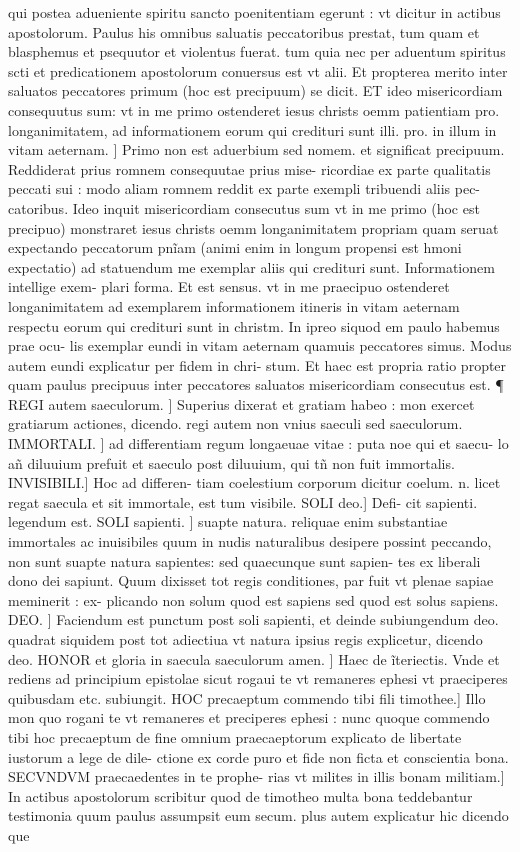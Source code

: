 \documentclass{article}
\begin{document}
\begin{pages}
qui postea adueniente spiritu sancto poenitentiam egerunt : vt dicitur in actibus apostolorum. Paulus his omnibus saluatis peccatoribus prestat, tum quam et blasphemus et psequutor et violentus fuerat. tum quia nec per aduentum spiritus scti et predicationem apostolorum conuersus est vt alii. Et propterea merito inter saluatos peccatores primum (hoc est precipuum) se dicit. ET ideo misericordiam consequutus sum: vt in me primo ostenderet iesus christs oemm patientiam pro. longanimitatem, ad informationem eorum qui credituri sunt illi. pro. in illum in vitam aeternam. ] Primo non est aduerbium sed nomem. et significat precipuum. Reddiderat prius romnem consequutae prius mise- ricordiae ex parte qualitatis peccati sui : modo aliam romnem reddit ex parte exempli tribuendi aliis pec- catoribus. Ideo inquit misericordiam consecutus sum vt in me primo (hoc est precipuo) monstraret iesus christs oemm longanimitatem propriam quam seruat expectando peccatorum pnĩam (animi enim in longum propensi est hmoni expectatio) ad statuendum me exemplar aliis qui credituri sunt. Informationem intellige exem- plari forma. Et est sensus. vt in me praecipuo ostenderet longanimitatem ad exemplarem informationem itineris in vitam aeternam respectu eorum qui credituri sunt in christm. In ipreo siquod em paulo habemus prae ocu- lis exemplar eundi in vitam aeternam quamuis peccatores simus. Modus autem eundi explicatur per fidem in chri- stum. Et haec est propria ratio propter quam paulus precipuus inter peccatores saluatos misericordiam consecutus est. ¶ REGI autem saeculorum. ] Superius dixerat et gratiam habeo : mon exercet gratiarum actiones, dicendo. regi autem non vnius saeculi sed saeculorum. IMMORTALI. ] ad differentiam regum longaeuae vitae : puta noe qui et saecu- lo añ diluuium prefuit et saeculo post diluuium, qui tñ non fuit immortalis. INVISIBILI.] Hoc ad differen- tiam coelestium corporum dicitur coelum. n. licet regat saecula et sit immortale, est tum visibile. SOLI deo.] Defi- cit sapienti. legendum est. SOLI sapienti. ] suapte natura. reliquae enim substantiae immortales ac inuisibiles quum in nudis naturalibus desipere possint peccando, non sunt suapte natura sapientes: sed quaecunque sunt sapien- tes ex liberali dono dei sapiunt. Quum dixisset tot regis conditiones, par fuit vt plenae sapiae meminerit : ex- plicando non solum quod est sapiens sed quod est solus sapiens. DEO. ] Faciendum est punctum post soli sapienti, et deinde subiungendum deo. quadrat siquidem post tot adiectiua vt natura ipsius regis explicetur, dicendo deo. HONOR et gloria in saecula saeculorum amen. ] Haec de ĩteriectis. Vnde et rediens ad principium epistolae sicut rogaui te vt remaneres ephesi vt praeciperes quibusdam etc. subiungit. HOC precaeptum commendo tibi fili timothee.] Illo mon quo rogani te vt remaneres et preciperes ephesi : nunc quoque commendo tibi hoc precaeptum de fine omnium praecaeptorum explicato de libertate iustorum a lege de dile- ctione ex corde puro et fide non ficta et conscientia bona. SECVNDVM praecaedentes in te prophe- rias vt milites in illis bonam militiam.] In actibus apostolorum scribitur quod de timotheo multa bona  \pend\pstart teddebantur testimonia quum paulus assumpsit eum secum. plus autem explicatur hic dicendo que   \pend
\marginpar{[ p.141 ]}

\end{pages}
\end{document}
